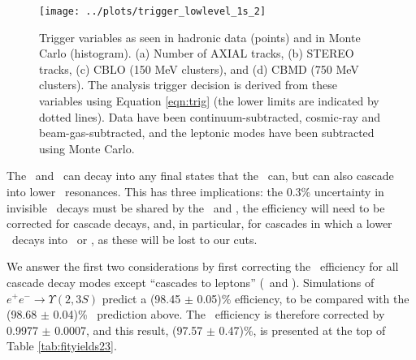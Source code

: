 \documentclass[aps,prd,preprint,superscriptaddress,tightenlines,nofootinbib,floatfix]{revtex4}
\begin{document}
\begin{figure}[p]
  \vspace{3 cm}
  \begin{center}
    \texttt{[image: ../plots/trigger\_lowlevel\_1s\_2]}
  \end{center}
  \caption{\label{fig:mctrig} Trigger variables as seen in hadronic
    data (points) and in Monte Carlo (histogram).  (a) Number of AXIAL
    tracks, (b) STEREO tracks, (c) CBLO (150 MeV clusters), and (d)
    CBMD (750 MeV clusters).  The analysis trigger decision is derived
    from these variables using Equation \ref{eqn:trig} (the lower
    limits are indicated by dotted lines).  Data have been
    continuum-subtracted, cosmic-ray and beam-gas-subtracted, and the
    leptonic modes have been subtracted using Monte Carlo.}
\end{figure}

The \utwo\ and \uthree\ can decay into any final states that the
\uone\ can, but can also cascade into lower \bbar\ resonances.  This
has three implications: the 0.3\% uncertainty in invisible \uone\
decays must be shared by the \utwo\ and \uthree, the efficiency will
need to be corrected for cascade decays, and, in particular, for
cascades in which a lower \ups\ decays into \ee\ or \mm, as these will
be lost to our cuts.

We answer the first two considerations by first correcting the \uone\
efficiency for all cascade decay modes except ``cascades to leptons''
(\ee\ and \mm).  Simulations of $e^+e^- \to \Upsilon(2,3S)$ predict a
(98.45 $\pm$ 0.05)\% efficiency, to be compared with the (98.68 $\pm$
0.04)\% \uone\ prediction above.
The \uone\ efficiency is therefore corrected by 0.9977 $\pm$ 0.0007,
and this result, (97.57 $\pm$ 0.47)\%, is presented at the top of
Table \ref{tab:fityields23}.
\end{document}
